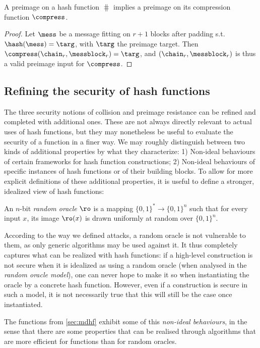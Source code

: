 \begin{prop}
A preimage on a \merkdam hash function $\hash$ implies a preimage on its compression function $\compress$.
\end{prop}
\begin{proof}
Let $\mess$ be a message fitting on $r+1$ blocks after padding s.t. $\hash(\mess) = \targ$, with $\targ$ the preimage target.
Then $\compress(\chain_r, \messblock_r) = \targ$, and $(\chain_r, \messblock_r)$ is thus a valid preimage input for $\compress$.
\end{proof}

\subsection{Refining the security of hash functions}

The three security notions of collision and preimage resistance can be refined and completed with additional ones. These are not always directly relevant to actual uses of hash functions, but they may nonetheless be useful to evaluate the security
of a function in a finer way. We may roughly distinguish between two kinds of additional properties by what they characterize: 1) Non-ideal behaviours of certain frameworks for hash function constructions; 2) Non-ideal
behaviours of specific instances of hash functions or of their building blocks.
To allow for more explicit definitions of these additional properties, it is useful to define a stronger, idealized view of hash functions:

\begin{defi}
An $n$-bit \emph{random oracle} $\ro$ is a mapping $\{0,1\}^* \rightarrow \{0,1\}^n$ such that for every input $x$, its image $\ro(x)$ is drawn uniformly at random over $\{0,1\}^n$.
\end{defi}

According to the way we defined attacks, a random oracle is not vulnerable to them, as only generic algorithms may be used against it. It thus completely captures what
can be realized with hash functions: if a high-level construction is not secure when it is idealized as using a random oracle (when analysed in the \emph{random oracle model}),
one can never hope to make it so when instantiating the oracle by a concrete hash function. However, even if a construction is secure in such a model, it is not necessarily true that
this will still be the case once instantiated.

The \merkdam functions from \autoref{sec:mdhf} exhibit some of this \emph{non-ideal behaviours},
in the sense that there are some properties that can be realised through algorithms that are more efficient for \merkdam functions than for random oracles.

